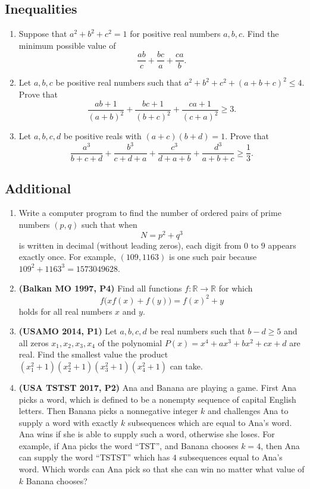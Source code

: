 \documentclass[12pt]{article}
\begin{document}
    \subsection{Inequalities}
      \begin{enumerate}[label=\textbf{B.\arabic*.}]
        \item Suppose that $a^2 + b^2 + c^2 = 1$ for positive real numbers $a, b, c$. Find the minimum possible value of
          \[
            \frac{ab}{c} + \frac{bc}{a} + \frac{ca}{b}.
          \]
        \item Let $a, b, c$ be positive real numbers such that $a^2 + b^2 + c^2 + (a+b+c)^2 \le 4$. Prove that
          \[
            \frac{ab + 1}{(a+b)^2} + \frac{bc + 1}{(b+c)^2} + \frac{ca + 1}{(c+a)^2} \ge 3.
          \]
        \item Let $a, b, c, d$ be positive reals with $(a+c)(b+d) = 1$. Prove that
          \[
            \frac{a^3}{b+c+d} + \frac{b^3}{c+d+a} + \frac{c^3}{d+a+b} + \frac{d^3}{a+b+c} \ge \frac13.
          \]
      \end{enumerate}
    \subsection{Additional}
      \begin{enumerate}[label=\textbf{C.\arabic*.}]
        \item Write a computer program to find the number of ordered pairs of prime numbers $(p,q)$ such that when
          \[
            N = p^2 + q^3
          \]
          is written in decimal (without leading zeros), each digit from $0$ to $9$ appears exactly once. For example, $(109,1163)$ is one
          such pair because $109^2 + 1163^3 = 1573049628$.
        \item \textbf{\textcolor{color2}{(Balkan MO 1997, P4)}} Find all functions $f:\mathbb{R}\to\mathbb{R}$ for which
          \[
            f\big(xf(x)+f(y)\big)=f(x)^2+y
          \]
          holds for all real numbers $x$ and $y$.
        \item \textbf{\textcolor{color2}{(USAMO 2014, P1)}} Let $a,b,c,d$ be real numbers such that $b-d\ge 5$ and all zeros $x_1,x_2,x_3,x_4$ of the polynomial $P(x)=x^4+ax^3+bx^2+cx+d$ are 
          real. Find the smallest value the product $(x_1^2+1)(x_2^2+1)(x_3^2+1)(x_4^2+1)$ can take.
        \item \textbf{\textcolor{color2}{(USA TSTST 2017, P2)}} Ana and Banana are playing a game. First Ana picks a word, which is defined to be a nonempty sequence of capital English
          letters. Then Banana picks a nonnegative integer $k$ and challenges Ana to supply a word with exactly $k$ subsequences which are 
          equal to Ana's word. Ana wins if she is able to supply such a word, otherwise she loses. For example, if Ana picks the word “TST”,
          and Banana chooses $k=4$, then Ana can supply the word “TSTST” which has $4$ subsequences equal to Ana's word. Which words can Ana 
          pick so that she can win no matter what value of $k$ Banana chooses?
      \end{enumerate}
\end{document}
